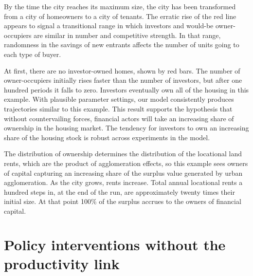 By the time the city reaches its maximum size, the city has been transformed from a city of homeowners to a city of tenants. The erratic rise of the red line appears to signal a transitional range in which investors and would-be owner-occupiers are similar in number and competitive strength. In that range, randomness in the savings of new entrants affects the number of units going to each type of buyer. 



At first, there are no investor-owned homes, shown by red bars. The number of owner-occupiers initially rises faster than the number of investors, but after one hundred periods it falls to zero. Investors eventually own all of the housing in this example.  With plausible parameter settings, our model consistently produces trajectories similar to this example. This result supports the hypothesis that without countervailing forces, financial actors will take an increasing share of ownership in the housing market. The tendency for investors to own an increasing share of the housing stock is robust across experiments in the model. 

The distribution of ownership determines the distribution of the locational land rents, which are the product of agglomeration effects, so this example sees owners of capital capturing an increasing share of the surplus value generated by urban agglomeration. %
As the city grows, rents increase. Total annual locational rents a hundred steps in, at the end of the run, are approximately twenty times their initial size. At that point 100\% of the surplus accrues to the owners of financial capital.

\hspace{1.5cm}

\section{Policy interventions without the productivity link}


